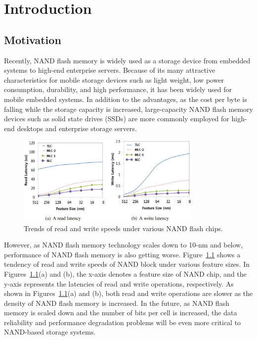 
\chapter{Introduction} 
\label{chap:Introduction}

\section{Motivation}
\label{sec:Intro_Motivation}
Recently, NAND flash memory is widely used as a storage device from
embedded systems to high-end enterprise servers. Because of its many attractive
characteristics for mobile storage devices such as light weight, low
power consumption, durability, and high performance, it has been widely
used for mobile embedded systems. In addition to the advantages, as the
cost per byte is falling while the storage capacity is increased, large-capacity
NAND flash memory devices such as solid state drives (SSDs) are more
commonly employed for high-end desktops and enterprise storage servers.

\begin{figure}[b]
	\centering
	\includegraphics[width=0.8\textwidth]{figure/intro/latency_trend}
	\caption{Trends of read and write speeds under various NAND flash chips.}
	\label{fig:latency_trend}
\end{figure}


However, as NAND flash memory technology scales down to 10-nm
and below, performance of NAND flash memory is also getting worse.
Figure~\ref{fig:latency_trend} shows a tendency of read and write speeds of NAND block under
various feature sizes. In Figures~\ref{fig:latency_trend}(a) and (b), 
the x-axis denotes a feature
size of NAND chip, and the y-axis represents the latencies of read and
write operations, respectively. As shown in Figures~\ref{fig:latency_trend}(a) and (b), 
both read and write operations are slower as the density of NAND flash memory is
increased. In the future, as NAND flash memory is scaled down and the
number of bits per cell is increased, the data reliability and performance
degradation problems will be even more critical to NAND-based storage
systems.

